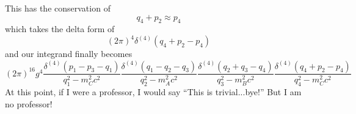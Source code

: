 This has the conservation of
\begin{equation}
q_4 + p_2\approx p_4
\end{equation}
which takes the delta form of
\begin{equation}
(2\pi)^4\delta^{(4)}(q_4 + p_2 - p_4)
\end{equation}
and our integrand finally becomes
\begin{equation}
(2\pi)^{16}g^4\frac{\delta^{(4)}(p_{1}-p_{3}-q_{1})}{q_{1}^2 - m_{C}^2c^2}\frac{\delta^{(4)}(q_1 - q_2 - q_3)}{q_{2}^2 - m_{A}^2c^2}\frac{\delta^{(4)}(q_2 + q_3 - q_4)}{q_{3}^2 - m_{B}^2c^2}\frac{\delta^{(4)}(q_4 + p_2 - p_4)}{q_{4}^2-m_{C}^2c^2} 
\end{equation}
At this point, if I were a professor, I would say ``This is trivial...bye!'' But
I am no professor!

